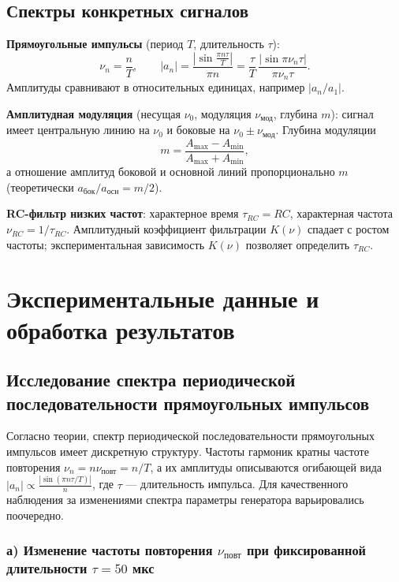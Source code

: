 \documentclass[a4paper,10pt]{article}
\begin{document}
\subsection*{Спектры конкретных сигналов}

\textbf{Прямоугольные импульсы} (период $T$, длительность $\tau$):
\begin{equation}
\nu_n = \frac{n}{T}, \qquad
|a_n| = \frac{\left|\sin\frac{\pi n\tau}{T}\right|}{\pi n}
= \frac{\tau}{T}\,\frac{|\sin\pi\nu_n\tau|}{\pi\nu_n\tau}.
\end{equation}
Амплитуды сравнивают в относительных единицах, например $|a_n/a_1|$.

\textbf{Амплитудная модуляция} (несущая $\nu_0$, модуляция $\nu_{\text{мод}}$, глубина $m$): сигнал имеет центральную линию на $\nu_0$ и боковые на $\nu_0 \pm \nu_{\text{мод}}$. Глубина модуляции
\begin{equation}
m = \frac{A_{\max} - A_{\min}}{A_{\max} + A_{\min}},
\end{equation}
а отношение амплитуд боковой и основной линий пропорционально $m$ (теоретически $a_{\text{бок}}/a_{\text{осн}} = m/2$).

\textbf{RC-фильтр низких частот}: характерное время $\tau_{RC} = RC$, характерная частота $\nu_{RC} = 1/\tau_{RC}$. Амплитудный коэффициент фильтрации $K(\nu)$ спадает с ростом частоты; экспериментальная зависимость $K(\nu)$ позволяет определить $\tau_{RC}$.

\section{Экспериментальные данные и обработка результатов}

\subsection*{ Исследование спектра периодической последовательности прямоугольных импульсов}

Согласно теории, спектр периодической последовательности прямоугольных импульсов имеет дискретную структуру. Частоты гармоник кратны частоте повторения \(\nu_n = n \nu_{\text{повт}} = n/T\), а их амплитуды описываются огибающей вида \(|a_n| \propto \frac{|\sin(\pi n \tau / T)|}{n}\), где \(\tau\) — длительность импульса. Для качественного наблюдения за изменениями спектра параметры генератора варьировались поочередно.

\subsubsection*{а) Изменение частоты повторения \(\nu_{\text{повт}}\) при фиксированной длительности \(\tau = 50\) мкс}
\end{document}
